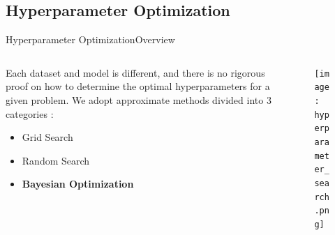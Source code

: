 \documentclass{beamer}
\begin{document}
        \subsection{Hyperparameter Optimization}

            \begin{frame}{Hyperparameter Optimization}{Overview}
                \begin{columns}
                    \begin{column}{0.5\textwidth}
                        Each dataset and model is different, and there is no rigorous proof on how to determine the optimal hyperparameters for a given problem. We adopt approximate methods divided into 3 categories \cite{aws-hyperparameter}:
                        \begin{itemize}
                            \item Grid Search
                            \item Random Search
                            \item \textbf{Bayesian Optimization}
                        \end{itemize}
                    \end{column}
                    \begin{column}{0.5\textwidth}
                        \begin{figure}[!htbp]
                            \centering
                            \texttt{[image: hyperparameter\_search.png]}
                        \end{figure}
                    \end{column}
                \end{columns}
            \end{frame}
\end{document}
